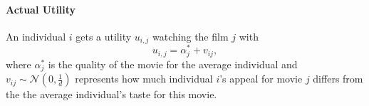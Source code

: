 \documentclass{article}
\begin{document}
\paragraph{Actual Utility}
An individual $i$ gets a utility $u_{i,j}$ watching the film $j$ with\\
\begin{equation} \label{eq:1}
u_{i,j}=\alpha_{j}^{*}+v_{i j},
\end{equation}
where $\alpha_{j}^{*}$ is the quality of the movie for the average individual and $v_{i j}\sim \mathcal{N}(0,\frac{1}{d})$ represents how much individual $i$'s appeal for movie $j$ differs from the the average individual's taste for this movie.\\
\end{document}
